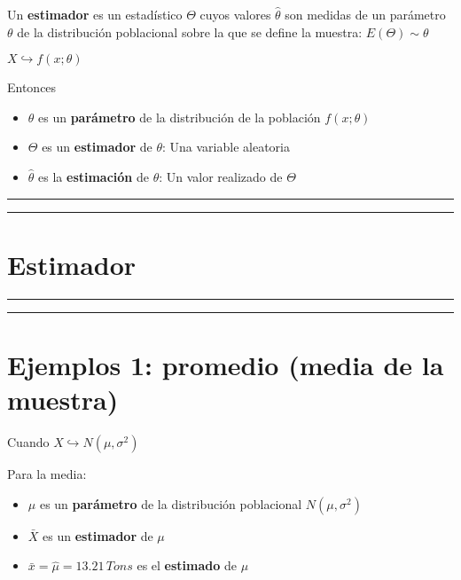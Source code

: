 \documentclass[
]{book}
\providecommand{\tightlist}{%
  \setlength{\itemsep}{0pt}\setlength{\parskip}{0pt}}
\begin{document}
Un \textbf{estimador} es un estadístico \(\Theta\) cuyos valores \(\hat{\theta}\) son medidas de un parámetro \(\theta\) de la distribución poblacional sobre la que se define la muestra: \(E(\Theta)\sim \theta\)

\(X \hookrightarrow f(x; \theta)\)

Entonces

\begin{itemize}
\tightlist
\item
  \(\theta\) es un \textbf{parámetro} de la distribución de la población \(f(x; \theta)\)
\item
  \(\Theta\) es un \textbf{estimador} de \(\theta\): Una variable aleatoria
\item
  \(\hat{\theta}\) es la \textbf{estimación} de \(\theta\): Un valor realizado de \(\Theta\)
\end{itemize}

\begin{center}\rule{0.5\linewidth}{0.5pt}\end{center}

\begin{center}\rule{0.5\linewidth}{0.5pt}\end{center}

\hypertarget{estimador-1}{%
\section{Estimador}\label{estimador-1}}

\begin{center}\rule{0.5\linewidth}{0.5pt}\end{center}

\begin{center}\rule{0.5\linewidth}{0.5pt}\end{center}

\hypertarget{ejemplos-1-promedio-media-de-la-muestra}{%
\section{Ejemplos 1: promedio (media de la muestra)}\label{ejemplos-1-promedio-media-de-la-muestra}}

Cuando \(X \hookrightarrow N(\mu, \sigma^2)\)

Para la media:

\begin{itemize}
\tightlist
\item
  \(\mu\) es un \textbf{parámetro} de la distribución poblacional \(N(\mu, \sigma^2)\)
\item
  \(\bar{X}\) es un \textbf{estimador} de \(\mu\)
\item
  \(\bar{x}=\hat{\mu}=13.21 \, Tons\) es el \textbf{estimado} de \(\mu\)
\end{itemize}
\end{document}
